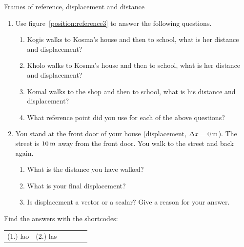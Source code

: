 \begin{exercises}{Frames of reference, displacement and distance}
            \nopagebreak \noindent
        \label{m38788*id64042}\begin{enumerate}[noitemsep, label=\textbf{\arabic*}. ] 
            \label{m38788*uid20}\item Use figure~\ref{position:reference3}  to answer the following questions.
\label{m38788*id64060}\begin{enumerate}[noitemsep, label=\textbf{\alph*}. ] 
            \label{m38788*uid21}\item Kogis walks to Kosma's house and then to school, what is her distance and displacement?
\label{m38788*uid22}\item Kholo walks to Kosma's house and then to school, what is her distance and displacement?
\label{m38788*uid23}\item Komal walks to the shop and then to school, what is his distance and displacement?
\label{m38788*uid24}\item What reference point did you use for each of the above questions?
\end{enumerate}
                \label{m38788*uid25}\item You stand at the front door of your house (displacement, $\Delta x=0\phantom{\rule{2pt}{0ex}}\text{m}$). The street is $10\phantom{\rule{2pt}{0ex}}\text{m}$ away from the front door. You walk to the street and back again.
\label{m38788*id64141}\begin{enumerate}[noitemsep, label=\textbf{\alph*}. ] 
            \label{m38788*uid26}\item What is the distance you have walked?
\label{m38788*uid27}\item What is your final displacement?
\label{m38788*uid28}\item Is displacement a vector or a scalar? Give a reason for your answer.
\end{enumerate}
                \end{enumerate}
  \label{m38788**end}
\par {} Find the answers with the shortcodes:
 \par \begin{tabular}[h]{cccccc}
 (1.) lao  &  (2.) las  & \end{tabular}
\end{exercises}

